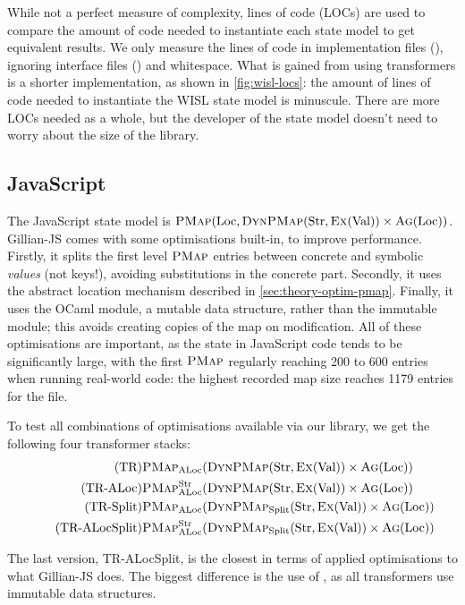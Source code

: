 While not a perfect measure of complexity, lines of code (LOCs) are used to compare the amount of code needed to instantiate each state model to get equivalent results. We only measure the lines of code in implementation files (), ignoring interface files () and whitespace. What is gained from using transformers is a shorter implementation, as shown in \autoref{fig:wisl-locs}: the amount of lines of code needed to instantiate the WISL state model is minuscule. There are more LOCs needed as a whole, but the developer of the state model doesn't need to worry about the size of the library.

\subsection{JavaScript}

The JavaScript state model is $\textsc{PMap}(\text{Loc}, \textsc{DynPMap}(\text{Str}, \textsc{Ex}(\text{Val})) \times \textsc{Ag}(\text{Loc}))$. Gillian-JS comes with some optimisations built-in, to improve performance. Firstly, it splits the first level $\textsc{PMap}$ entries between concrete and symbolic \emph{values} (not keys!), avoiding substitutions in the concrete part. Secondly, it uses the abstract location mechanism described in \cref{sec:theory-optim-pmap}. Finally, it uses the OCaml  module, a mutable data structure, rather than the immutable  module; this avoids creating copies of the map on modification. All of these optimisations are important, as the state in JavaScript code tends to be significantly large, with the first $\textsc{PMap}$ regularly reaching 200 to 600 entries when running real-world code: the highest recorded map size reaches 1179 entries for the  file.

To test all combinations of optimisations available via our library, we get the following four transformer stacks:
\begin{align}
\tag{TR}           & \textsc{PMap}_{\text{ALoc}}(\textsc{DynPMap}(\text{Str}, \textsc{Ex}(\text{Val})) \times \textsc{Ag}(\text{Loc})) \\
\tag{TR-ALoc}      & \textsc{PMap}_{\text{ALoc}}^{\text{Str}}(\textsc{DynPMap}(\text{Str}, \textsc{Ex}(\text{Val})) \times \textsc{Ag}(\text{Loc})) \\
\tag{TR-Split}     & \textsc{PMap}_{\text{ALoc}}(\textsc{DynPMap}_{\text{Split}}(\text{Str}, \textsc{Ex}(\text{Val})) \times \textsc{Ag}(\text{Loc})) \\
\tag{TR-ALocSplit} & \textsc{PMap}_{\text{ALoc}}^{\text{Str}}(\textsc{DynPMap}_{\text{Split}}(\text{Str}, \textsc{Ex}(\text{Val})) \times \textsc{Ag}(\text{Loc}))
 \end{align}

The last version, TR-ALocSplit, is the closest in terms of applied optimisations to what Gillian-JS does. The biggest difference is the use of , as all transformers use immutable data structures.

